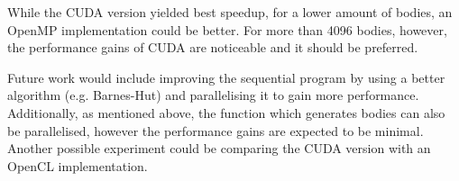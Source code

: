 \documentclass[12pt, a4paper]{article}
\begin{document}
    While the CUDA version yielded best speedup, for a lower amount of bodies, an OpenMP implementation could be better. For more than 4096 bodies, however, the performance gains of CUDA are noticeable and it should be preferred.

    Future work would include improving the sequential program by using a better algorithm (e.g. Barnes-Hut) and parallelising it to gain more performance. Additionally, as mentioned above, the function which generates bodies can also be parallelised, however the performance gains are expected to be minimal. Another possible experiment could be comparing the CUDA version with an OpenCL implementation.

    \newpage
    
    		
\end{document}
